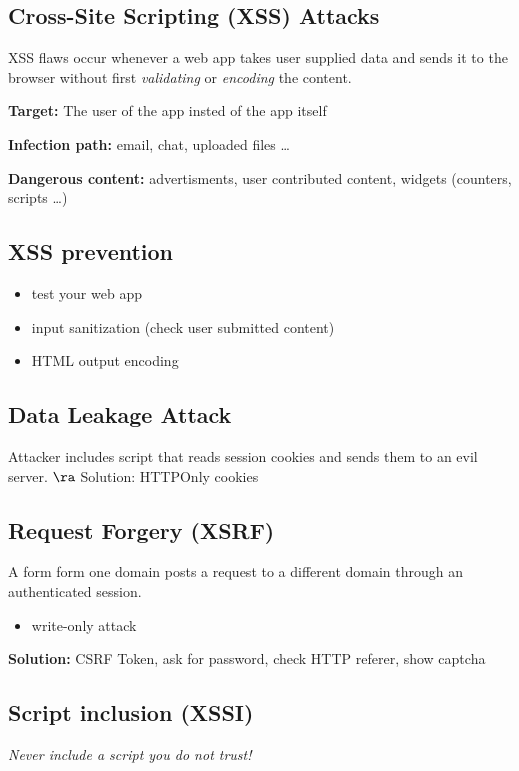 \documentclass[fs, footer]{latex4ei}
\begin{document}
\begin{multicols*}{4}
\subsection{Cross-Site Scripting (XSS) Attacks}
XSS flaws occur whenever a web app takes user supplied data and sends it to the browser without first \emph{validating} or \emph{encoding} the content.

\textbf{Target:} The user of the app insted of the app itself

\textbf{Infection path:} email, chat, uploaded files \ldots

\textbf{Dangerous content:} advertisments, user contributed content, widgets (counters, scripts \ldots)

\subsection{XSS prevention}
\begin{itemize}
  \item test your web app
  \item input sanitization (check user submitted content)
  \item HTML output encoding
\end{itemize}

\subsection{Data Leakage Attack}
Attacker includes script that reads session cookies and sends them to an evil server. $\ra$ Solution: HTTPOnly cookies

\subsection{Request Forgery (XSRF)}
A form form one domain posts a request to a different domain through an authenticated session.

\begin{itemize}
  \item write-only attack
\end{itemize}

\textbf{Solution:} CSRF Token, ask for password, check HTTP referer, show captcha

\subsection{Script inclusion (XSSI)}

\emph{Never include a script you do not trust!}


\end{multicols*}
\end{document}
